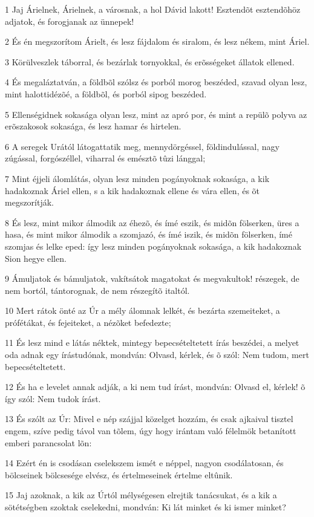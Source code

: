 \par 1 Jaj Árielnek, Árielnek, a városnak, a hol Dávid lakott! Esztendõt esztendõhöz adjatok, és forogjanak az ünnepek!
\par 2 És én megszorítom Árielt, és lesz fájdalom és siralom, és lesz nékem, mint Áriel.
\par 3 Körülveszlek táborral, és bezárlak tornyokkal, és erõsségeket állatok ellened.
\par 4 És megaláztatván, a földbõl szólsz és porból morog beszéded, szavad olyan lesz, mint halottidézõé, a földbõl, és porból sipog beszéded.
\par 5 Ellenségidnek sokasága olyan lesz, mint az apró por, és mint a repülõ polyva az erõszakosok sokasága, és lesz hamar és hirtelen.
\par 6 A seregek Urától látogattatik meg, mennydörgéssel, földindulással, nagy zúgással, forgószéllel, viharral és emésztõ tûzi lánggal;
\par 7 Mint éjjeli álomlátás, olyan lesz minden pogányoknak sokasága, a kik hadakoznak Áriel ellen, s a kik hadakoznak ellene és vára ellen, és õt megszorítják.
\par 8 És lesz, mint mikor álmodik az éhezõ, és ímé eszik, és midõn fölserken, üres a hasa, és mint mikor álmodik a szomjazó, és ímé iszik, és midõn fölserken, ímé szomjas és lelke eped: így lesz minden pogányoknak sokasága, a kik hadakoznak Sion hegye ellen.
\par 9 Ámuljatok és bámuljatok, vakítsátok magatokat és megvakultok! részegek, de nem bortól, tántorognak, de nem részegítõ italtól.
\par 10 Mert rátok önté az Úr a mély álomnak lelkét, és bezárta szemeiteket, a prófétákat, és fejeiteket, a nézõket befedezte;
\par 11 És lesz mind e látás néktek, mintegy bepecsételtetett írás beszédei, a melyet oda adnak egy írástudónak, mondván: Olvasd, kérlek, és õ szól: Nem tudom, mert bepecsételtetett.
\par 12 És ha e levelet annak adják, a ki nem tud írást, mondván: Olvasd el, kérlek! õ így szól: Nem tudok írást.
\par 13 És szólt az Úr: Mivel e nép szájjal közelget hozzám, és csak ajkaival tisztel engem, szíve pedig távol van tõlem, úgy  hogy irántam való félelmök betanított emberi parancsolat lõn:
\par 14 Ezért én is csodásan cselekszem ismét e néppel, nagyon csodálatosan, és bölcseinek bölcsesége elvész, és értelmeseinek értelme eltûnik.
\par 15 Jaj azoknak, a kik az Úrtól mélységesen elrejtik tanácsukat, és a kik a sötétségben szoktak cselekedni, mondván: Ki lát  minket és ki ismer minket?
